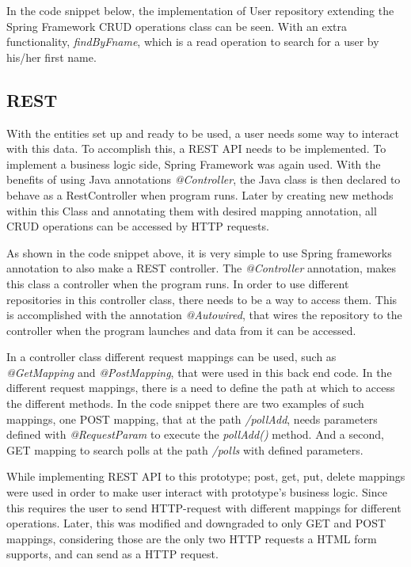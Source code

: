 In the code snippet below, the implementation of User repository extending the Spring Framework CRUD operations class can be seen. With an extra functionality, \textit{findByFname}, which is a read operation to search for a user by his/her first name.\vspace{\baselineskip}


\subsection{REST}\label{sub:rest}
With the entities set up and ready to be used, a user needs some way to interact with this data. To accomplish this, a REST API needs to be implemented. To implement a business logic side, Spring Framework was again used. With the benefits of using Java annotations \textit{@Controller}, the Java class is then declared to behave as a RestController when program runs. Later by creating new methods within this Class and annotating them with desired mapping annotation, all CRUD operations can be accessed by HTTP requests.\vspace{\baselineskip}
\vspace{\baselineskip}

As shown in the code snippet above, it is very simple to use Spring frameworks annotation to also make a REST controller. The \textit{@Controller} annotation, makes this class a controller when the program runs. In order to use different repositories in this controller class, there needs to be a way to access them. This is accomplished with the annotation \textit{@Autowired}, that wires the repository to the controller when the program launches and data from it can be accessed.

In a controller class different request mappings can be used, such as \textit{@GetMapping} and \textit{@PostMapping}, that were used in this back end code. In the different request mappings, there is a need to define the path at which to access the different methods. In the code snippet there are two examples of such mappings, one POST mapping, that at the path \textit{/pollAdd}, needs parameters defined with \textit{@RequestParam} to execute the \textit{pollAdd()} method. And a second, GET mapping to search polls at the path \textit{/polls} with defined parameters.

While implementing REST API to this prototype; post, get, put, delete mappings were used in order to make user interact with prototype's business logic. Since this requires the user to send HTTP-request with different mappings for different operations. Later, this was modified and downgraded to only GET and POST mappings, considering those are the only two HTTP requests a HTML form supports, and can send as a HTTP request.

